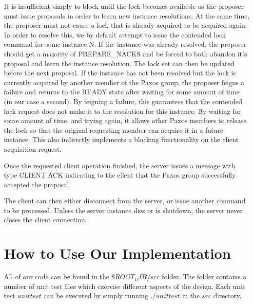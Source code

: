 \documentclass{article}
\begin{document}
It is insufficient simply to block until the lock becomes available as the proposer must issue proposals in order to learn new instance resolutions.
At the same time, the proposer must not cause a lock that is already acquired to be acquired again.
In order to resolve this, we by default attempt to issue the contended lock command for some instance N.
If the instance was already resolved, the proposer should get a majority of PREPARE\_NACKS and be forced to both abandon it's proposal and learn the instance resolution.
The lock set can then be updated before the next proposal.
If the instance has not been resolved but the lock is currently acquired by another member of the Paxos group, the proposer feigns a failure and returns to the READY state after waiting for some amount of time (in our case a second).
By feigning a failure, this guarantees that the contended lock request does not make it to the resolution for this instance.
By waiting for some amount of time, and trying again, it allows other Paxos members to release the lock so that the original requesting member can acquire it in a future instance.
This also indirectly implements a blocking functionality on the client acquisition request.

Once the requested client operation finished, the server issues a message with type CLIENT ACK indicating to the client that the Paxos group successfully accepted the proposal.

The client can then either disconnect from the server, or issue another command to be processed.
Unless the server instance dies or is shutdown, the server never closes the client connection.



\section{How to Use Our Implementation}

All of our code can be found in the $\${ROOT_DIR}/src$ folder.
The folder contains a number of unit test files which exercise different aspects of the design.
Each unit test $unittest$ can be executed by simply running $./unittest$ in the $src$ directory.
\end{document}
